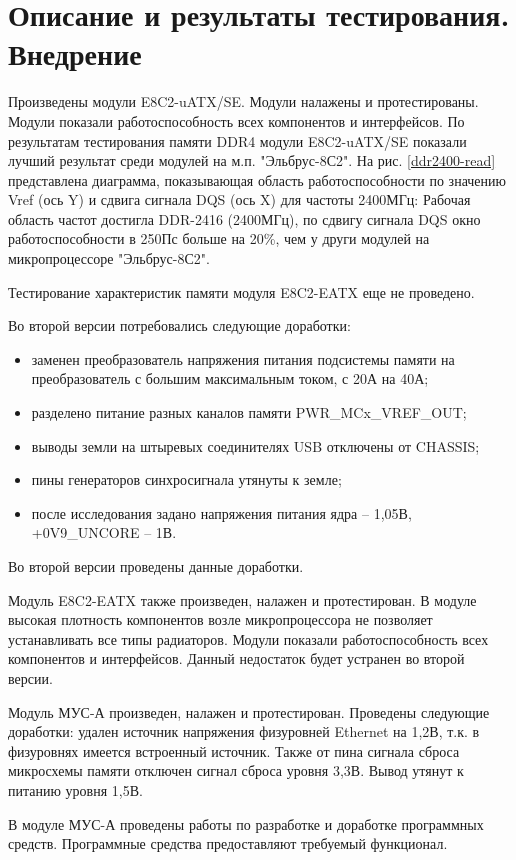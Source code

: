 \section{Описание и результаты тестирования. Внедрение}

Произведены модули E8C2-uATX/SE. Модули налажены и протестированы. Модули показали работоспособность всех компонентов и интерфейсов. По результатам тестирования памяти DDR4 модули E8C2-uATX/SE показали лучший результат среди модулей на м.п. "Эльбрус-8С2". На рис. \ref{ddr2400-read} представлена диаграмма, показывающая область работоспособности по значению Vref (ось Y) и сдвига сигнала DQS (ось X) для частоты 2400МГц:
Рабочая область частот достигла DDR-2416 (2400МГц), по сдвигу сигнала DQS окно работоспособности в 250Пс больше на 20\%, чем у други модулей на микропроцессоре "Эльбрус-8С2".


Тестирование характеристик памяти модуля E8C2-EATX еще не проведено. 

Во второй версии потребовались следующие доработки:
\begin{itemize}
	\item заменен преобразователь напряжения питания подсистемы памяти на преобразователь с большим максимальным током, с 20А на 40А;
	\item разделено питание разных каналов памяти PWR\_MCx\_VREF\_OUT;
	\item выводы земли на штыревых соединителях USB отключены от CHASSIS;
	\item пины генераторов синхросигнала утянуты к земле;
	\item после исследования задано напряжения питания ядра -- 1,05В, +0V9\_UNCORE -- 1В.
\end{itemize}

Во второй версии проведены данные доработки.

Модуль E8C2-EATX также произведен, налажен и протестирован. В модуле высокая плотность компонентов возле микропроцессора не позволяет устанавливать все типы радиаторов. Модули показали работоспособность всех компонентов и интерфейсов. Данный недостаток будет устранен во второй версии.

Модуль МУС-А произведен, налажен и протестирован. 
Проведены следующие доработки: удален источник напряжения физуровней Ethernet на 1,2В, т.к. в физуровнях имеется встроенный источник. Также от пина сигнала сброса микросхемы памяти отключен сигнал сброса уровня 3,3В. Вывод утянут к питанию уровня 1,5В.

В модуле МУС-А проведены работы по разработке и доработке программных средств. Программные средства предоставляют требуемый функционал.

\clearpage
